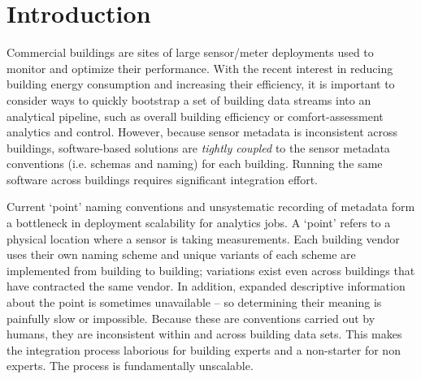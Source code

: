 \section{Introduction}



Commercial buildings are sites of large sensor/meter deployments used to monitor and optimize their performance.  
With the recent interest in reducing building energy consumption and
increasing their efficiency, it
is important to consider ways to quickly bootstrap a set of building data streams
into an analytical pipeline, such as overall building efficiency or
comfort-assessment analytics and control.
However, because sensor metadata is inconsistent across buildings, software-based
solutions are \emph{tightly coupled} to the sensor metadata conventions (i.e. schemas and naming) for
each building. 
Running the same software across buildings requires significant integration effort.

Current `point' naming conventions and unsystematic recording of metadata form a 
bottleneck in deployment scalability for analytics jobs.  A `point' refers to a 
physical location where a sensor is taking measurements. 
Each building vendor uses their own naming scheme and
unique variants of each scheme are implemented from building to building; variations exist
even across buildings that have contracted the same vendor.
In addition, expanded descriptive information about the point is sometimes unavailable 
-- so determining their meaning is painfully slow or impossible.  
Because these are conventions carried
out by humans, they are inconsistent within and across building data sets.
This makes the integration process laborious for building experts and a non-starter for 
non experts.  The process is fundamentally unscalable.


